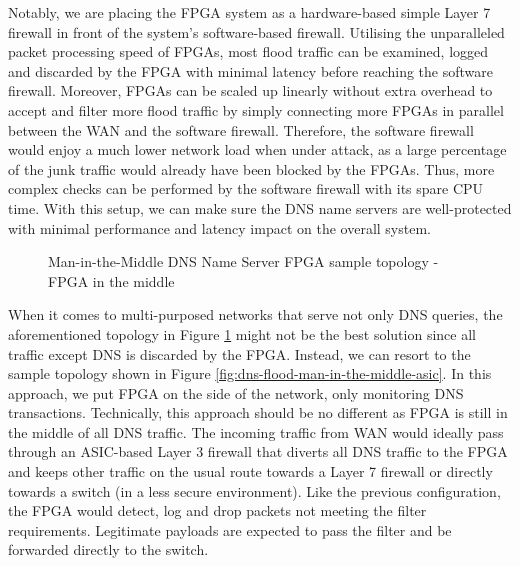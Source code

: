 \documentclass[a4paper]{report}
\begin{document}
Notably, we are placing the FPGA system as a hardware-based simple Layer 7 firewall in front of the system's software-based firewall. Utilising the unparalleled packet processing speed of FPGAs, most flood traffic can be examined, logged and discarded by the FPGA with minimal latency before reaching the software firewall. Moreover, FPGAs can be scaled up linearly without extra overhead to accept and filter more flood traffic by simply connecting more FPGAs in parallel between the WAN and the software firewall. Therefore, the software firewall would enjoy a much lower network load when under attack, as a large percentage of the junk traffic would already have been blocked by the FPGAs. Thus, more complex checks can be performed by the software firewall with its spare CPU time. With this setup, we can make sure the DNS name servers are well-protected with minimal performance and latency impact on the overall system.

\begin{figure}[H]
  \caption{Man-in-the-Middle DNS Name Server FPGA sample topology - FPGA in the middle}
  \label{fig:dns-flood-man-in-the-middle}
\end{figure}

When it comes to multi-purposed networks that serve not only DNS queries, the aforementioned topology in Figure \ref{fig:dns-flood-man-in-the-middle} might not be the best solution since all traffic except DNS is discarded by the FPGA. Instead, we can resort to the sample topology shown in Figure \ref{fig:dns-flood-man-in-the-middle-asic}. In this approach, we put FPGA on the side of the network, only monitoring DNS transactions. Technically, this approach should be no different as FPGA is still in the middle of all DNS traffic. The incoming traffic from WAN would ideally pass through an ASIC-based Layer 3 firewall that diverts all DNS traffic to the FPGA and keeps other traffic on the usual route towards a Layer 7 firewall or directly towards a switch (in a less secure environment). Like the previous configuration, the FPGA would detect, log and drop packets not meeting the filter requirements. Legitimate payloads are expected to pass the filter and be forwarded directly to the switch.
\end{document}
